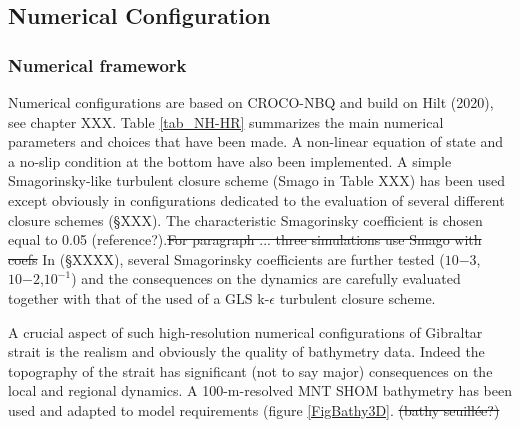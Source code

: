 \subsection{Numerical Configuration}
\label{section3Dnum}

\subsubsection{Numerical framework}

\color{blue}Numerical configurations are based on \color{black} CROCO-NBQ and build on Hilt (2020), see chapter XXX. \color{black} Table \ref{tab_NH-HR} summarizes \color{blue} the main numerical parameters and choices that have been made. A non-linear equation of state and a no-slip condition at the bottom have also been implemented. \color{blue} A simple Smagorinsky-like turbulent closure scheme (Smago in Table XXX) has been used except obviously in configurations dedicated to the evaluation of several different closure schemes (\S XXX). The characteristic Smagorinsky coefficient is chosen equal to 0.05 (reference?).\sout{For paragraph ... three simulations use Smago with coefs} In (\S XXXX), several Smagorinsky coefficients are further tested  ($10{-3}$,$10{-2}$,$10^{-1}$) and the consequences on the dynamics are carefully evaluated together with that of the used of a GLS k-$\epsilon$ turbulent closure scheme. \color{black}

\color{blue}A crucial aspect of such high-resolution numerical configurations of Gibraltar strait is the realism and obviously the quality of bathymetry data. Indeed the topography of the strait has significant (not to say major) consequences on the local and regional dynamics. A 100-m-resolved MNT SHOM bathymetry has been used and adapted to model requirements (figure \ref{FigBathy3D}. \sout{(bathy seuillée?)} \color{black}

